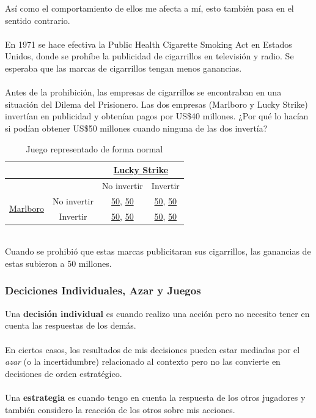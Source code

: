 \documentclass{article}
\newcommand{\ulcolor}[2][Red]{\setulcolor{#1}\ul{#2}}
\begin{document}
                Así como el comportamiento de ellos me afecta a mí, esto también pasa en el sentido contrario. \\
                \\
                En 1971 se hace efectiva la Public Health Cigarette Smoking Act en Estados Unidos, donde se prohíbe la publicidad de cigarrillos en televisión y radio. Se esperaba que las marcas de cigarrillos tengan menos ganancias. \\
                \\
                Antes de la prohibición, las empresas de cigarrillos se encontraban en una situación del Dilema del Prisionero. Las dos empresas (Marlboro y Lucky Strike) invertían en publicidad y obtenían pagos por US\$40 millones. ¿Por qué lo hacían si podían obtener US\$50 millones cuando ninguna de las dos invertía? 
                \begin{table}[h]
                    \centering
                        \begin{tabular}{|c|c|c|c|}
                        \hline
                                                &               & \multicolumn{2}{c|}{\ulcolor[Blue]{Lucky Strike}}                                  \\ \hline
                                                &               & No invertir                           & Invertir                              \\ \hline
                        \multirow{2}{*}{\ulcolor[Red]{Marlboro}} 
                                                & No invertir   & \ulcolor[Red]{50}, \ulcolor[Blue]{50} & \ulcolor[Red]{50}, \ulcolor[Blue]{50} \\ \cline{2-4} 
                                                & Invertir      & \ulcolor[Red]{50}, \ulcolor[Blue]{50} & \ulcolor[Red]{50}, \ulcolor[Blue]{50} \\\hline
                        \end{tabular}
                    \caption{Juego representado de forma normal}
                \end{table} \\
                Cuando se prohibió que estas marcas publicitaran sus cigarrillos, las ganancias de estas subieron a 50 millones.
            \subsubsection*{Deciciones Individuales, Azar y Juegos}
                Una \textbf{decisión individual} es cuando realizo una acción pero no necesito tener en cuenta las respuestas de los demás. \\
                \\
                En ciertos casos, los resultados de mis decisiones pueden estar mediadas por el \emph{azar} (o la incertidumbre) relacionado al contexto pero no las convierte en decisiones de orden estratégico. \\
                \\
                Una \textbf{estrategia} es cuando tengo en cuenta la respuesta de los otros jugadores y también considero la reacción de los otros sobre mis acciones.
\end{document}
